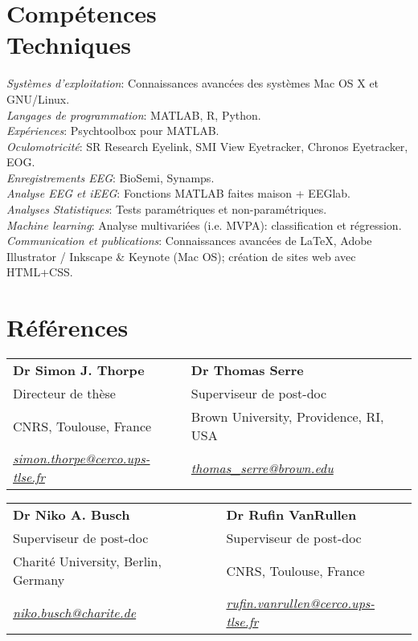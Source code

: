 \documentclass[margin,line]{resume}
\begin{document}
\begin{resume}
\newpage

\vspace{3mm}
\section{\mysidestyle Compétences\\Techniques}
	\textsl{Systèmes d'exploitation}: Connaissances avancées des systèmes Mac OS X et GNU/Linux.\\
	\textsl{Langages de programmation}: MATLAB, R, Python.\\
	\textsl{Expériences}: Psychtoolbox pour MATLAB.\\
	\textsl{Oculomotricité}: SR Research Eyelink, SMI View Eyetracker, Chronos Eyetracker, EOG.\\
	\textsl{Enregistrements EEG}: BioSemi, Synamps.\\
	\textsl{Analyse EEG et iEEG}: Fonctions MATLAB faites maison + EEGlab.\\
	\textsl{Analyses Statistiques}: Tests paramétriques et non-paramétriques.\\
	\textsl{Machine learning}: Analyse multivariées (i.e. MVPA): classification et régression.\\
	\textsl{Communication et publications}: Connaissances avancées de \LaTeX, Adobe Illustrator / Inkscape \& Keynote (Mac OS); création de sites web avec HTML+CSS.

\vspace{3mm}
\section{\mysidestyle Références} 

	\begin{tabular}{@{}p{6cm}p{6cm}}
	\textbf{Dr Simon J. Thorpe}       &  \textbf{Dr Thomas Serre}                   \\
	Directeur de thèse                              &  Superviseur de post-doc                       \\
	CNRS, Toulouse, France          &  Brown University, Providence, RI, USA        \\
	\textsl{\href{mailto:simon.thorpe@cerco.ups-tlse.fr}{simon.thorpe@cerco.ups-tlse.fr}}   &  
	\textsl{\href{mailto:thomas_serre@brown.edu}{thomas\_serre@brown.edu}}    \\
	\end{tabular}
	
	\begin{tabular}{@{}p{6cm}p{6cm}}
	\textbf{Dr Niko A. Busch}       &  \textbf{Dr Rufin VanRullen}                   \\
	Superviseur de post-doc                   &  Superviseur de post-doc                       \\
	Charité University, Berlin, Germany         &  CNRS, Toulouse, France        \\
	\textsl{\href{mailto:niko.busch@charite.de}{niko.busch@charite.de}}  &  
	\textsl{\href{mailto:rufin.vanrullen@cerco.ups-tlse.fr}{rufin.vanrullen@cerco.ups-tlse.fr}}    \\
	\end{tabular}


	
\end{resume}
\end{document}
